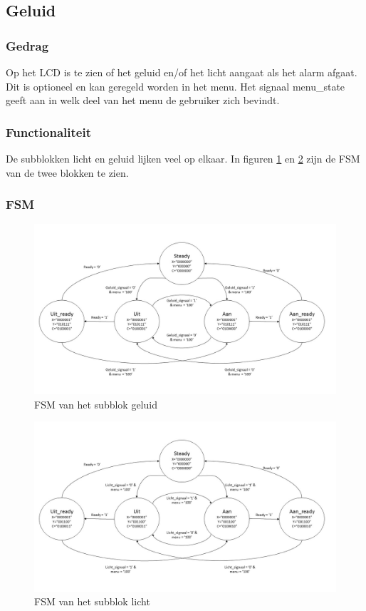 \subsection{Geluid}

\subsubsection{Gedrag}
Op het LCD is te zien of het geluid en/of het licht aangaat als het alarm afgaat. Dit is optioneel en kan geregeld worden in het menu. Het signaal menu\_state geeft aan in welk deel van het menu de gebruiker zich bevindt.

\subsubsection{Functionaliteit}
De subblokken licht en geluid lijken veel op elkaar. In figuren \ref{fig:FSMgeluid} en \ref{fig:FSMlicht} zijn de FSM van de twee blokken te zien.

\subsubsection{FSM}

\begin{figure}[h!]
\includegraphics[width=15cm]{verslagschemas/FSMs/geluid.jpg}
\caption{FSM van het subblok geluid}
\label{fig:FSMgeluid}
\end{figure}

\begin{figure}[h!]
\includegraphics[width=15cm]{verslagschemas/FSMs/licht.jpg}
\caption{FSM van het subblok licht}
\label{fig:FSMlicht}
\end{figure}

